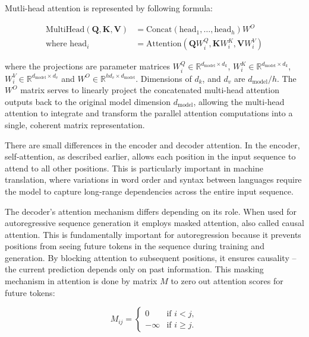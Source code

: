 Mutli-head attention is represented by following formula:

\begin{equation}
\begin{aligned}
\text{MultiHead}(\textbf{Q}, \textbf{K}, \textbf{V}) &= \text{Concat}(\text{head}_1, \ldots, \text{head}_h)W^O \\
\text{where } \text{head}_i &= \text{Attention}(\textbf{Q}W^Q_i, \textbf{K}W^K_i, \textbf{V}W^V_i)
\end{aligned}
\end{equation}

where the projections are parameter matrices $W^Q_i \in \mathbb{R}^{d_{\text{model}} \times d_k}$, $W^K_i \in \mathbb{R}^{d_{\text{model}} \times d_k}$, $W^V_i \in \mathbb{R}^{d_{\text{model}} \times d_v}$ and $W^O \in \mathbb{R}^{hd_v \times d_{\text{model}}}$. Dimensions of $d_k$, and $d_v$ are $d_{\text{model}}/h$. The $W^O$ matrix serves to linearly project the concatenated multi-head attention outputs back to the original model dimension $d_{\text{model}}$, allowing the multi-head attention to integrate and transform the parallel attention computations into a single, coherent matrix representation.
\newline

There are small differences in the encoder and decoder attention. In the encoder, self-attention, as described earlier, allows each position in the input sequence to attend to all other positions. This is particularly important in machine translation, where variations in word order and syntax between languages require the model to capture long-range dependencies across the entire input sequence.

The decoder's attention mechanism differs depending on its role. When used for autoregressive sequence generation it employs masked attention, also called causal attention. This is fundamentally important for autoregression because it prevents positions from seeing future tokens in the sequence during training and generation. By blocking attention to subsequent positions, it ensures causality – the current prediction depends only on past information. This masking mechanism in attention is done by matrix $M$ to zero out attention scores for future tokens:

\begin{equation}
    M_{ij} =
\begin{cases} 
0 & \text{if } i < j, \\
-\infty & \text{if } i \geq j.
\end{cases}
\end{equation}

